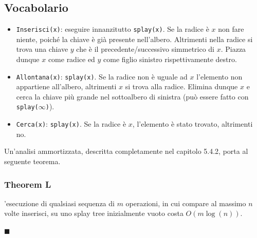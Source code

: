 \documentclass[a4paper]{book}
\newenvironment{mytheorem}[1]{\subsubsection*{Theorem #1}}{\begin{flushright}$\blacksquare$\end{flushright}}
\newcommand{\inline}[1]{\lstinline!#1!}%
\begin{document}
\subsection*{Vocabolario}
\begin{itemize}
\item \inline{Inserisci(x)}: eseguire innanzitutto \inline{splay(x)}. Se la radice è $x$ non fare niente, poiché la chiave è già presente nell'albero. Altrimenti nella radice si trova una chiave $y$ che è il precedente/successivo simmetrico di $x$. Piazza dunque $x$ come radice ed $y$ come figlio sinistro rispettivamente destro.
\item \inline{Allontana(x)}: \inline{splay(x)}. Se la radice non è uguale ad $x$ l'elemento non appartiene all'albero, altrimenti $x$ si trova alla radice. Elimina dunque $x$ e cerca la chiave più grande nel sottoalbero di sinistra (può essere fatto con \inline{splay(}$\infty$\inline{)}). 
\item \inline{Cerca(x)}: \inline{splay(x)}. Se la radice è $x$, l'elemento è stato trovato, altrimenti no.
\end{itemize}
Un'analisi ammortizzata, descritta completamente nel capitolo 5.4.2, porta al seguente teorema.
\begin{mytheorem}{5.1}
L'esecuzione di qualsiasi sequenza di $m$ operazioni, in cui compare al massimo $n$ volte inserisci, su uno splay tree inizialmente vuoto costa $O(m\log (n))$. 
\end{mytheorem}
\end{document}
